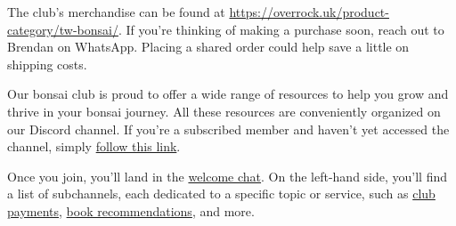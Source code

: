 \label{2025-07-news}


	
	

{}
\noindent
The club's merchandise can be found at \url{https://overrock.uk/product-category/tw-bonsai/}. If you're thinking of making a purchase soon, reach out to Brendan on WhatsApp. Placing a shared order could help save a little on shipping costs.

\medskip
{}
\noindent  
Our bonsai club is proud to offer a wide range of resources to help you grow and thrive in your bonsai journey. All these resources are conveniently organized on our Discord channel. If you're a subscribed member and haven’t yet accessed the channel, simply \href{https://discord.gg/N6yka6XJ}{follow this link}.

Once you join, you'll land in the \href{https://discord.com/channels/873817545013071872/1118677826208550923}{welcome chat}. On the left\--hand side, you'll find a list of subchannels, each dedicated to a specific topic or service, such as \href{https://discord.com/channels/873817545013071872/1039691122148130876}{club payments}, \href{https://discord.com/channels/873817545013071872/1001189937409949698}{book recommendations}, and more. 


